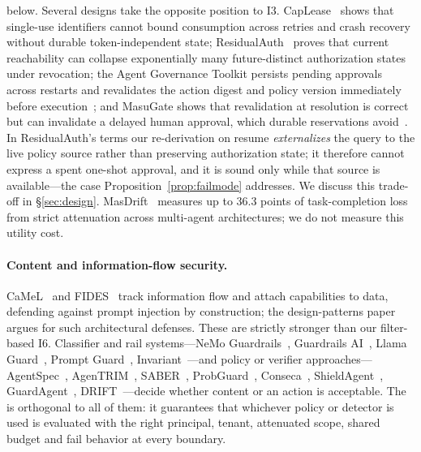 below. Several designs take the opposite position to I3. CapLease~\cite{xu2026caplease} shows that single-use identifiers cannot bound consumption across retries and crash recovery without durable token-independent state; ResidualAuth~\cite{choi2026residualauth} proves that current reachability can collapse exponentially many future-distinct authorization states under revocation; the Agent Governance Toolkit persists pending approvals across restarts and revalidates the action digest and policy version immediately before execution~\cite{msagentgovernance}; and MasuGate shows that revalidation at resolution is correct but can invalidate a delayed human approval, which durable reservations avoid~\cite{peng2026statefulgov}. In ResidualAuth's terms our re-derivation on resume \emph{externalizes} the query to the live policy source rather than preserving authorization state; it therefore cannot express a spent one-shot approval, and it is sound only while that source is available---the case Proposition~\ref{prop:failmode} addresses. We discuss this trade-off in \S\ref{sec:design}. MasDrift~\cite{xu2026masdrift} measures up to 36.3 points of task-completion loss from strict attenuation across multi-agent architectures; we do not measure this utility cost.

\paragraph{Content and information-flow security.} CaMeL~\cite{debenedetti2025camel} and FIDES~\cite{costa2025fides} track information flow and attach capabilities to data, defending against prompt injection by construction; the design-patterns paper~\cite{beurerkellner2025designpatterns} argues for such architectural defenses. These are strictly stronger than our filter-based I6. Classifier and rail systems---NeMo Guardrails~\cite{rebedea2023nemo}, Guardrails AI~\cite{guardrailsai}, Llama Guard~\cite{inan2023llamaguard}, Prompt Guard~\cite{metapromptguard}, Invariant~\cite{invariantguardrails}---and policy or verifier approaches---AgentSpec~\cite{wang2026agentspec}, AgenTRIM~\cite{betser2026agentrim}, SABER~\cite{cuadron2025saber}, ProbGuard~\cite{wang2025pro2guard}, Conseca~\cite{tsai2025conseca}, ShieldAgent~\cite{chen2025shieldagent}, GuardAgent~\cite{xiang2025guardagent}, DRIFT~\cite{li2025drift}---decide whether content or an action is acceptable. The \gec{} is orthogonal to all of them: it guarantees that whichever policy or detector is used is evaluated with the right principal, tenant, attenuated scope, shared budget and fail behavior at every boundary.

